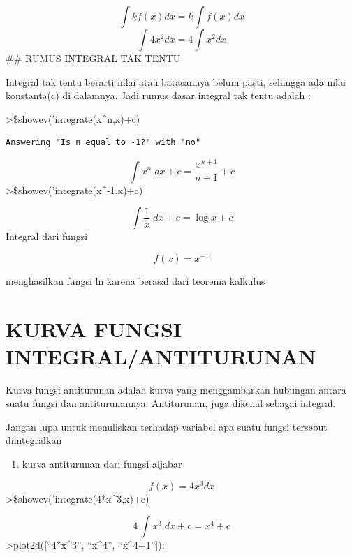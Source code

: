 \documentclass[
]{book}
\providecommand{\tightlist}{%
  \setlength{\itemsep}{0pt}\setlength{\parskip}{0pt}}
\begin{document}
\[\int kf(x)dx=k \int f(x)dx\]\[\int 4x^2dx=4 \int x^2dx\]\#\# RUMUS INTEGRAL TAK TENTU

Integral tak tentu berarti nilai atau batasannya belum pasti, sehingga ada nilai konstanta(c) di dalamnya. Jadi rumus dasar integral tak tentu adalah :

\textgreater\$showev('integrate(x\^{}n,x)+c)

\begin{verbatim}
Answering "Is n equal to -1?" with "no"
\end{verbatim}

\[\int {x^{n}}{\;dx}+c=\frac{x^{n+1}}{n+1}+c\]\textgreater\$showev('integrate(x\^{}-1,x)+c)

\[\int {\frac{1}{x}}{\;dx}+c=\log x+c\]Integral dari fungsi

\[f(x)=x^{-1}\]

menghasilkan fungsi ln karena berasal dari teorema kalkulus

\section{KURVA FUNGSI INTEGRAL/ANTITURUNAN}\label{kurva-fungsi-integralantiturunan}

Kurva fungsi antiturunan adalah kurva yang menggambarkan hubungan antara suatu fungsi dan antiturunannya. Antiturunan, juga dikenal sebagai integral.

Jangan lupa untuk menuliskan terhadap variabel apa suatu fungsi tersebut diintegralkan

\begin{enumerate}
\def\labelenumi{\arabic{enumi}.}
\tightlist
\item
  kurva antiturunan dari fungsi aljabar
\end{enumerate}

\[ f(x)=4x^3 dx\]\textgreater\$showev('integrate(4*x\^{}3,x)+c)

\[4\,\int {x^3}{\;dx}+c=x^4+c\]\textgreater plot2d({[}``4*x\^{}3'', ``x\^{}4'', ``x\^{}4+1''{]}):
\end{document}
